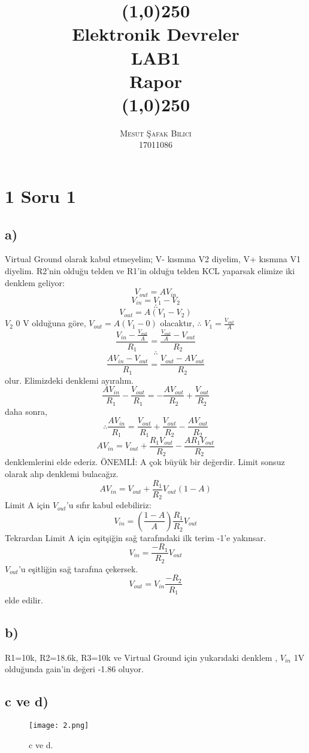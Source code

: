 \documentclass[11pt]{article}
\date{}
\begin{document}
\title{\line(1,0){250} \\ \huge{\textbf{Elektronik Devreler  \\ LAB1 \\Rapor}} \\\line(1,0){250}}
\author{\textsc{Mesut Şafak Bilici} \\ 17011086}
\maketitle
\section{1 Soru 1}
\subsection{a)}
Virtual Ground olarak kabul etmeyelim; V- kısmına V2 diyelim, V+ kısmına V1 diyelim. R2’nin olduğu telden ve R1’in olduğu telden KCL yaparsak elimize iki denklem geliyor:
$$ V_{out} = AV_{in}$$
$$ V_{in} = V_1 - V_2$$
$$\therefore$$
$$V_{out} = A(V_1 - V_2)$$
$V_2$ 0 V olduğuna göre, $V_{out} = A(V_1 - 0)$ olacaktır, $\therefore$ $V_1 = \frac{V_{out}}{A}$
$$\frac{V_{in} - \frac{V_{out}}{A}}{R_1} = \frac{\frac{V_{out}}{A}-V_{out}}{R_2}$$
$$\therefore$$
$$\frac{AV_{in} - V_{out}}{R_1} = \frac{V_{out}-AV_{out}}{R_2} $$
olur. Elimizdeki denklemi ayıralım. 
$$\frac{AV_{in}}{R_1} -  \frac{V_{out}}{R_1} = -\frac{AV_{out}}{R_2} +  \frac{V_{out}}{R_2}$$
daha sonra,
$$\therefore\frac{AV_{in}}{R_1} = \frac{V_{out}}{R_1} + \frac{V_{out}}{R_2} - \frac{AV_{out}}{R_2}$$
$$AV_{in} = V_{out} + \frac{R_1 V_{out}}{R_2}-\frac{AR_1V_{out}}{R_2}$$
denklemlerini elde ederiz.
ÖNEMLİ: A çok büyük bir değerdir. Limit sonsuz olarak alıp denklemi bulacağız.
$$AV_{in} = V_{out} + \frac{R_1}{R_2}V_{out}(1-A)$$
Limit A için $V_{out}$'u sıfır kabul edebiliriz:
$$V_{in} = \left(\frac{1-A}{A}\right)\frac{R_1}{R_2}V_{out}$$
Tekrardan Limit A için eşitşiğin sağ tarafındaki ilk terim -1'e yakınsar.
$$V_{in} = \frac{-R_1}{R_2}V_{out}$$
$V_{out}$'u eşitliğin sağ tarafına çekersek.
$$V_{out} = V_{in} \frac{-R_2}{R_1}$$
elde edilir.
\subsection{b)}
R1=10k, R2=18.6k, R3=10k ve Virtual Ground için yukarıdaki denklem , $V_{in}$ 1V olduğunda gain'in değeri -1.86 oluyor. 

\subsection{c ve d)}
\begin{figure}[H]
\centering
\texttt{[image: 2.png]}
\caption{c ve d.}
\label{fig:figure3}
\end{figure}
\end{document}
